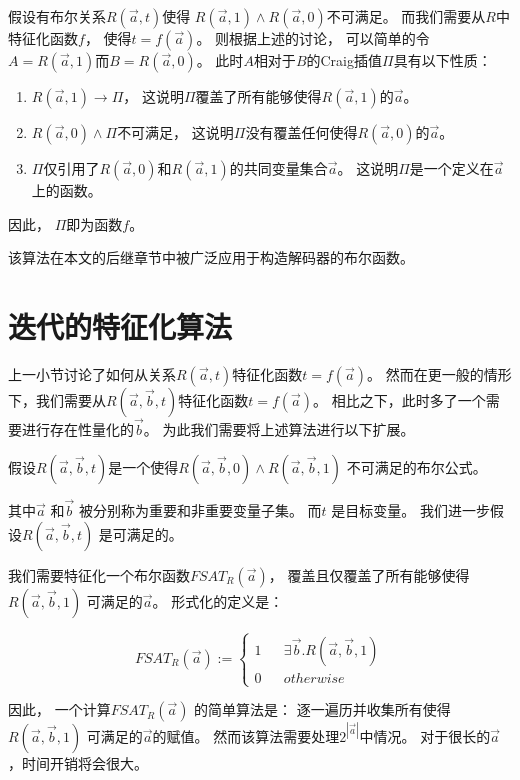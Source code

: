 假设有布尔关系$R(\vec{a},t)$使得
$R(\vec{a},1)\wedge R(\vec{a},0)$不可满足。
而我们需要从$R$中特征化函数$f$，
使得$t=f(\vec{a})$。
则根据上述的讨论，
可以简单的令$A=R(\vec{a},1)$而$B=R(\vec{a},0)$。
此时$A$相对于$B$的Craig插值$\Pi$具有以下性质：

\begin{enumerate}
\item $R(\vec{a},1)\to \Pi$，
这说明$\Pi$覆盖了所有能够使得$R(\vec{a},1)$的$\vec{a}$。
\item $R(\vec{a},0)\wedge \Pi$不可满足，
这说明$\Pi$没有覆盖任何使得$R(\vec{a},0)$的$\vec{a}$。
\item $\Pi$仅引用了$R(\vec{a},0)$和$R(\vec{a},1)$的共同变量集合$\vec{a}$。
这说明$\Pi$是一个定义在$\vec{a}$上的函数。
\end{enumerate}

因此，
$\Pi$即为函数$f$。

该算法在本文的后继章节中被广泛应用于构造解码器的布尔函数。


\section{迭代的特征化算法}\label{sec_iterativecraig}
上一小节讨论了如何从关系$R(\vec{a},t)$特征化函数$t=f(\vec{a})$。
然而在更一般的情形下，我们需要从$R(\vec{a},\vec{b},t)$特征化函数$t=f(\vec{a})$。
相比之下，此时多了一个需要进行存在性量化的$\vec{b}$。
为此我们需要将上述算法进行以下扩展。

假设$R(\vec{a},\vec{b},t)$是一个使得$R(\vec{a},\vec{b},0)\wedge R(\vec{a},\vec{b},1)$ 不可满足的布尔公式。

其中$\vec{a}$ 和$\vec{b}$ 被分别称为重要和非重要变量子集。
而$t$ 是目标变量。
我们进一步假设$R(\vec{a},\vec{b},t)$ 是可满足的。

我们需要特征化一个布尔函数$FSAT_R(\vec{a})$，
覆盖且仅覆盖了所有能够使得$R(\vec{a},\vec{b},1)$ 可满足的$\vec{a}$。
形式化的定义是：

\begin{equation}\label{fchar}
FSAT_R(\vec{a}):=
\left\{
\begin{array}{rcl}
1 & & \exists\vec{b}.R(\vec{a},\vec{b},1) \\
0 & & otherwise
\end{array}
\right.
\end{equation}

因此，
一个计算$FSAT_R(\vec{a})$ 的简单算法是：
逐一遍历并收集所有使得$R(\vec{a},\vec{b},1)$ 可满足的$\vec{a}$的赋值。
然而该算法需要处理$2^{|\vec{a}|}$中情况。
对于很长的$\vec{a}$，时间开销将会很大。

